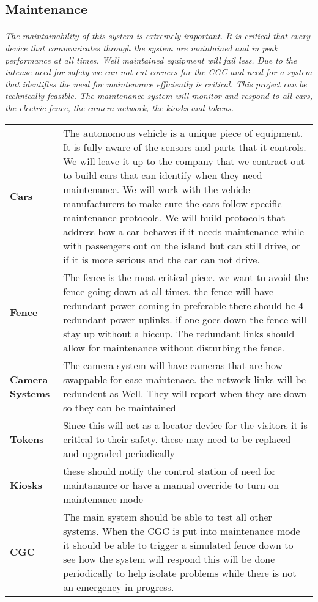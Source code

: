 \documentclass[12pt]{article}
\begin{document}
    \subsection{Maintenance}
    \paragraph{} \textit{The maintainability of this system is extremely important. 
    It is critical that every device that communicates through the system are maintained 
    and in peak performance at all times. Well maintained equipment will fail less. Due to 
    the intense need for safety we can not cut corners for the CGC and need for a system 
    that identifies the need for maintenance efficiently is critical. This project can 
    be technically feasible. The maintenance system will monitor and respond to all cars, 
    the electric fence, the camera network, the kiosks and tokens.}
    
    \begin{table}[H]
        \begin{tabular}{lp{10cm}}
        \textbf{Cars} & The autonomous vehicle is a unique piece of equipment. It is fully 
        aware of the sensors and parts that it controls. We will leave it up to the 
        company that we contract out to build cars that can identify when they need 
        maintenance. We will work with the vehicle manufacturers to make sure the cars 
        follow specific maintenance protocols. We will build protocols that address how 
        a car behaves if it needs maintenance while with passengers out on the island but 
        can still drive, or if it is more serious and the car can not drive.\\
        \textbf{Fence} & The fence is the most critical piece. we want to avoid the fence going down at all times.
        the fence will have redundant power coming in preferable there should be 4 redundant power uplinks. 
        if one goes down the fence will stay up without a hiccup. The redundant links should allow for 
        maintenance without disturbing the fence.\\
        \textbf{Camera Systems} & The camera system will have cameras that are how swappable for ease maintenace. the network links will be redundent as Well.
         They will report when they are down so they can be maintained\\
        \textbf{Tokens} & Since this will act as a locator device for the visitors 
        it is critical to their safety. these may need to be replaced and upgraded periodically\\
        \textbf{Kiosks} & these should notify the control station of need for maintanance or have a manual override to turn on maintenance mode\\
        \textbf{CGC} & The main system should be able to test all other systems. When the CGC is 
        put into maintenance mode it should be able to trigger a simulated fence down to see how 
        the system will respond this will be done periodically to help isolate problems while 
        there is not an emergency in progress.\\        
        \end{tabular}
    \end{table}
\end{document}

